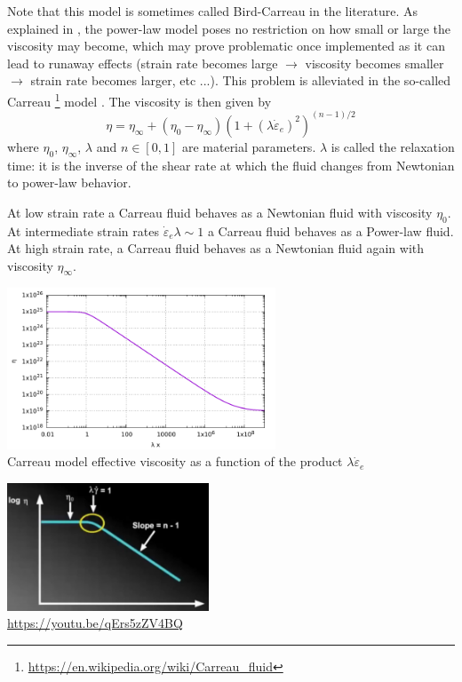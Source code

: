 Note that this model is sometimes called Bird-Carreau in the literature. 
As explained in \cite{reddybook2}, the power-law model poses no restriction on 
how small or large the viscosity may become, which may prove problematic once 
implemented as it can lead to runaway effects (strain rate becomes large $\rightarrow$
viscosity becomes smaller $\rightarrow$ strain rate becomes larger, etc ...).
This problem is alleviated in the so-called Carreau
\footnote{\url{https://en.wikipedia.org/wiki/Carreau_fluid}} model \cite{zifr07}. 
The viscosity is then given by
\begin{equation}
\eta = \eta_\infty + (\eta_0-\eta_\infty) \left(1 + (\lambda \dot{\varepsilon}_{e})^2 \right)^{(n-1)/2}
\end{equation}
where $\eta_0$, $\eta_\infty$, $\lambda$ and $n\in[0,1]$ are material parameters. 
$\lambda$ is called the relaxation time: it is the inverse of the shear rate at which 
the fluid changes from Newtonian to power-law behavior.

At low strain rate a Carreau fluid behaves as a Newtonian fluid with viscosity $\eta_0$.
At intermediate strain rates $\dot{\varepsilon}_{e} \lambda \sim 1$ a Carreau fluid behaves 
as a Power-law fluid. At high strain rate, a Carreau fluid behaves as a Newtonian fluid 
again with viscosity $\eta_\infty$.
 
\begin{center}
\includegraphics[width=8cm]{images/rheology/carreau/carreau.pdf}\\
{\captionfont Carreau model effective viscosity as a function of the product $\lambda \dot{\varepsilon}_{e}$}
\end{center}

\begin{center}
\includegraphics[width=6cm]{images/rheology/carreau/carreau1}\\
{\captionfont \url{https://youtu.be/qErs5zZV4BQ}}
\end{center}

